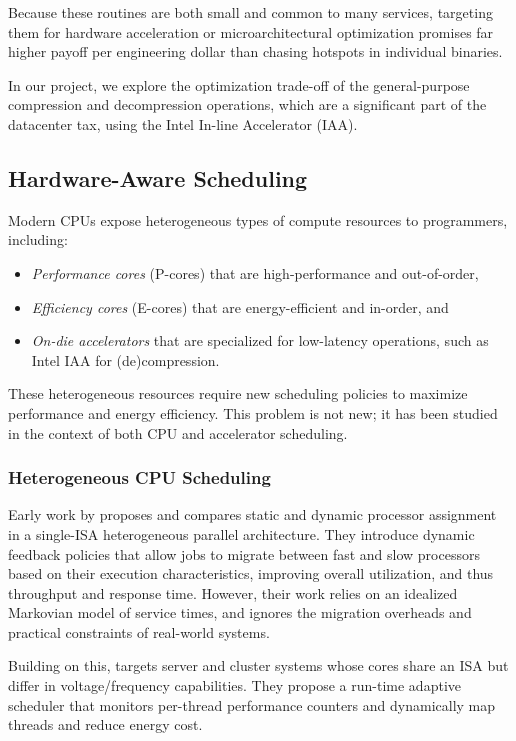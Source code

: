 Because these routines are both small and common to many services, targeting them for hardware acceleration or microarchitectural optimization promises far higher payoff per engineering dollar than chasing hotspots in individual binaries.

In our project, we explore the optimization trade-off of the general-purpose compression and decompression operations, which are a significant part of the datacenter tax, using the Intel In-line Accelerator (IAA).

\subsection{Hardware-Aware Scheduling}

Modern CPUs expose heterogeneous types of compute resources to programmers, including:
\begin{itemize}
  \item \emph{Performance cores} (P-cores) that are high-performance and out-of-order,
  \item \emph{Efficiency cores} (E-cores) that are energy-efficient and in-order, and
  \item \emph{On-die accelerators} that are specialized for low-latency operations, such as Intel IAA for (de)compression.
\end{itemize}
These heterogeneous resources require new scheduling policies to maximize performance and energy efficiency.
This problem is not new; it has been studied in the context of both CPU and accelerator scheduling.

\subsubsection{Heterogeneous CPU Scheduling}

Early work by \cite{menasceStaticDynamic1995} proposes and compares static and dynamic processor assignment in a single-ISA heterogeneous parallel architecture.
They introduce dynamic feedback policies that allow jobs to migrate between fast and slow processors based on their execution characteristics, improving overall utilization, and thus throughput and response time.
However, their work relies on an idealized Markovian model of service times, and ignores the migration overheads and practical constraints of real-world systems.

Building on this, \cite{ghiasiSchedulingHeterogeneous2005} targets server and cluster systems whose cores share an ISA but differ in voltage/frequency capabilities.
They propose a run-time adaptive scheduler that monitors per-thread performance counters and dynamically map threads and reduce energy cost.

